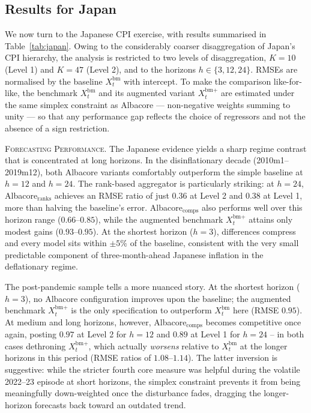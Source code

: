 \subsection{Results for Japan}

We now turn to the Japanese CPI exercise, with results summarised in Table~\ref{tab:japan}. Owing to the considerably coarser disaggregation of Japan's CPI hierarchy, the analysis is restricted to two levels of disaggregation, $K=10$ (Level 1) and $K=47$ (Level 2), and to the horizons $h \in \{3, 12, 24\}$. RMSEs are normalised by the baseline $X^{\text{bm}}_t$ with intercept. To make the comparison like-for-like, the benchmark $X^{\text{bm}}_t$ and its augmented variant $X^{\text{bm}+}_t$ are estimated under the same simplex constraint as Albacore --- non-negative weights summing to unity --- so that any performance gap reflects the choice of regressors and not the absence of a sign restriction.

\textsc{Forecasting Performance}. The Japanese evidence yields a sharp regime contrast that is concentrated at long horizons. In the disinflationary decade (2010m1--2019m12), both Albacore variants comfortably outperform the simple baseline at $h=12$ and $h=24$. The rank-based aggregator is particularly striking: at $h=24$, Albacore$_{\text{ranks}}$ achieves an RMSE ratio of just $0.36$ at Level 2 and $0.38$ at Level 1, more than halving the baseline's error. Albacore$_{\text{comps}}$ also performs well over this horizon range ($0.66$--$0.85$), while the augmented benchmark $X^{\text{bm}+}_t$ attains only modest gains ($0.93$--$0.95$). At the shortest horizon ($h=3$), differences compress and every model sits within $\pm 5\%$ of the baseline, consistent with the very small predictable component of three-month-ahead Japanese inflation in the deflationary regime.

The post-pandemic sample tells a more nuanced story. At the shortest horizon ($h=3$), no Albacore configuration improves upon the baseline; the augmented benchmark $X^{\text{bm}+}_t$ is the only specification to outperform $X^{\text{bm}}_t$ here (RMSE $0.95$). At medium and long horizons, however, Albacore$_{\text{comps}}$ becomes competitive once again, posting $0.97$ at Level 2 for $h=12$ and $0.89$ at Level 1 for $h=24$ -- in both cases dethroning $X^{\text{bm}+}_t$, which actually \emph{worsens} relative to $X^{\text{bm}}_t$ at the longer horizons in this period (RMSE ratios of $1.08$--$1.14$). The latter inversion is suggestive: while the stricter fourth core measure was helpful during the volatile 2022--23 episode at short horizons, the simplex constraint prevents it from being meaningfully down-weighted once the disturbance fades, dragging the longer-horizon forecasts back toward an outdated trend.

